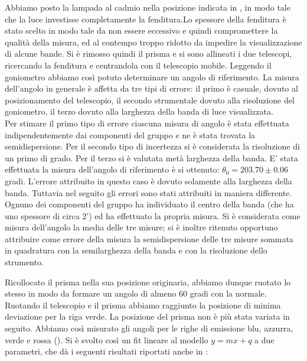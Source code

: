 Abbiamo posto la lampada al cadmio nella posizione indicata in , in modo tale che la luce investisse completamente la fenditura.Lo spessore della fenditura è stato scelto in modo tale da non essere eccessivo e quindi compromettere la qualità della misura, ed al contempo troppo ridotto da impedire la visualizzazione di alcune bande. \newline
 Si è rimosso quindi il prisma e si sono allineati i due telescopi, ricercando la fenditura e centrandola con il telescopio mobile. Leggendo il goniometro abbiamo così potuto determinare un angolo di riferimento. \newline
  La misura dell'angolo in generale è affetta da tre tipi di errore: il primo è casuale, dovuto al posizionamento del telescopio, il secondo strumentale dovuto alla  risoluzione del goniometro, il terzo dovuto alla larghezza della banda di luce visualizzata. \\
Per stimare il primo tipo di errore ciascuna misura di angolo è stata effettuata indipendentemente dai componenti del gruppo e ne è stata trovata la semidispersione. Per il secondo tipo di incertezza si è considerata la risoluzione di un primo di grado. Per il terzo si è valutata metà larghezza della banda. \newline
 E' stata effettuata la misura dell'angolo di riferimento è si ottenuto: $\theta_{0}=203.70 \pm 0.06$ gradi. L'errore attribuito in questo caso è dovuto solamente alla larghezza della banda. Tuttavia nel seguito gli errori sono stati attribuiti in maniera differente. Ognuno dei componenti del gruppo ha individuato il centro della banda (che ha uno spessore di circa 2') ed ha effettuato la propria misura. Si è  considerata come misura dell'angolo la media delle tre misure; si è inoltre ritenuto opportuno attribuire come errore della misura la semidispersione delle tre misure sommata in quadratura con la semilarghezza della banda e con la risoluzione dello strumento.  \newline
 
Ricollocato il prisma nella sua posizione originaria, abbiamo dunque ruotato lo stesso in modo da formare un angolo di almeno 60 gradi con la normale. Ruotando il telescopio e il prisma abbiamo raggiunto la posizione di minima deviazione per la riga verde. La posizione del prisma non è più stata variata in seguito. Abbiamo così misurato gli angoli per le righe di emissione blu, azzurra, verde e rossa (). Si è svolto così un fit lineare al modello $y=mx+q$ a due parametri, che dà i seguenti risultati riportati anche in :

